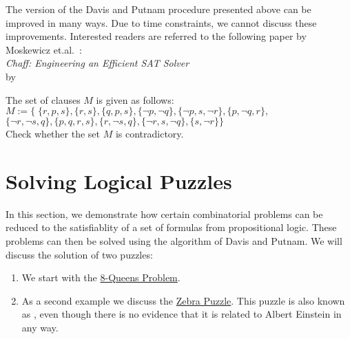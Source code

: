 The version of the Davis and Putnam procedure presented above can be improved in many ways.
Due to time constraints, we cannot discuss these improvements. Interested readers are
referred to the following paper by Moskewicz et.al.~\cite{moskewicz:2001}: 
\\[0.2cm]
\hspace*{1.3cm} \textsl{Chaff: Engineering an Efficient SAT Solver} \\
\hspace*{1.3cm} by  

\exerciseEng
The set of clauses $M$ is given as follows: \\[0.2cm]
\hspace*{1.3cm} $M := \bigl\{ \; \{ r, p, s \},
                         \{r, s \}, \{ q, p, s \},
                         \{ \neg p,  \neg q\},
                         \{ \neg p, s,  \neg r\},
                         \{p,  \neg q, r \},$ \\[0.2cm]
\hspace*{2.6cm} $\{ \neg r,  \neg s, q\},
                         \{p, q, r, s \},
                         \{r,  \neg s, q\},
                         \{ \neg r,  s, \neg q\},
                         \{s, \neg r\} \bigr\}$ \\[0.2cm]
Check whether the set $M$ is contradictory.  \eox

\section{Solving Logical Puzzles}
In this section, we demonstrate how certain combinatorial problems can be reduced to the satisfiablity of a
set of formulas from propositional logic.  These problems can then be solved using the algorithm of
Davis and Putnam.  We will discuss the solution of two puzzles:
\begin{enumerate}
\item We start with the
      \href{https://en.wikipedia.org/wiki/Eight_queens_puzzle}{8-Queens Problem}. 
\item As a second example we discuss the
      \href{https://en.wikipedia.org/wiki/Zebra_puzzle}{Zebra Puzzle}.  This
      puzzle is also known as , even though there is no
      evidence that it is related to Albert Einstein in any way.
\end{enumerate}

